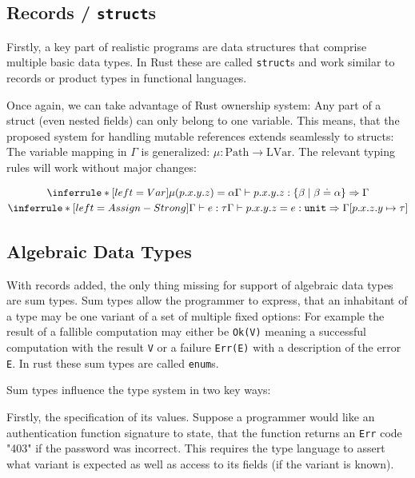 \documentclass{book}
\newcommand{\code}[1]{\texttt{#1}}
\theoremstyle{definition}
\begin{document}
\subsection{Records / \code{struct}s}

Firstly, a key part of realistic programs are data structures that comprise multiple basic data types. In Rust these are called \code{struct}s and work similar to records or product types in functional languages. 

Once again, we can take advantage of Rust ownership system: Any part of a struct (even nested fields) can only belong to one variable. This means, that the proposed system for handling mutable references extends seamlessly to structs: 
The variable mapping in $\Gamma$ is generalized: $\mu : \text{Path} \to \text{LVar}$. The relevant typing rules will work without major changes:

\begin{gather*}
  \inferrule*[left=Var]
    {\mu(p.x.y.z) = \alpha}
    {\Gamma \vdash p.x.y.z : \{ \beta \mid \beta \doteq \alpha \} \Rightarrow \Gamma}
    \\
  \inferrule*[left=Assign-Strong]
    {\Gamma \vdash e : \tau}
    {\Gamma \vdash p.x.y.z = e : \code{unit} \Rightarrow \Gamma[p.x.z.y \mapsto \tau]}
\end{gather*}

\subsection{Algebraic Data Types}

With records added, the only thing missing for support of algebraic data types are sum types.
Sum types allow the programmer to express, that an inhabitant of a type may be one variant of a set of multiple fixed options: For example the result of a fallible computation may either be \code{Ok(V)} meaning a successful computation with the result \code{V} or a failure \code{Err(E)} with a description of the error \code{E}.
In rust these sum types are called \code{enum}s.

Sum types influence the type system in two key ways: 

Firstly, the specification of its values. Suppose a programmer would like an authentication function signature to state, that the function returns an \code{Err} code "403" if the password was incorrect. This requires the type language to assert what variant is expected as well as access to its fields (if the variant is known).
\end{document}
